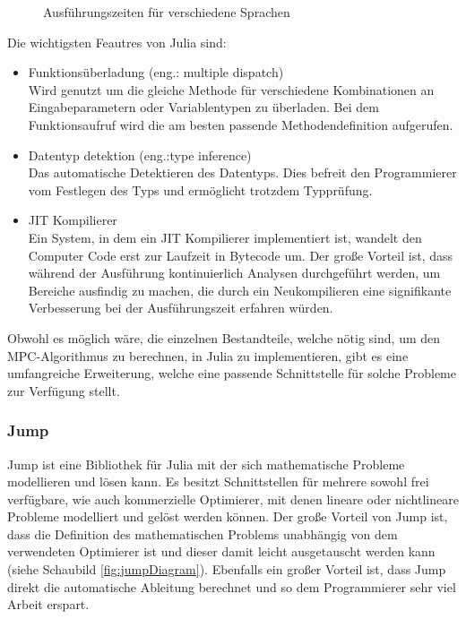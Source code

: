 \documentclass{like}
\begin{document}
\begin{figure}[ht!]
	\centering
	 
	\caption{Ausführungszeiten für verschiedene Sprachen}
	\label{fig:juliaBench}
\end{figure}

Die wichtigsten Feautres von Julia sind:

\begin{itemize}
	
	\item Funktionsüberladung (eng.: multiple dispatch)\\Wird genutzt um die gleiche Methode für verschiedene Kombinationen an Eingabeparametern oder Variablentypen zu überladen. Bei dem Funktionsaufruf wird die am besten passende Methodendefinition aufgerufen. \\
	\item Datentyp detektion (eng.:type inference) \\Das automatische Detektieren des Datentyps. Dies befreit den Programmierer vom Festlegen des Typs und ermöglicht trotzdem Typprüfung. \\
	\item \ac{JIT} Kompilierer\\ Ein System, in dem ein \ac{JIT} Kompilierer implementiert ist, wandelt den Computer Code erst zur Laufzeit in Bytecode um. Der große Vorteil ist, dass während der Ausführung kontinuierlich Analysen durchgeführt werden, um Bereiche ausfindig zu machen, die durch ein Neukompilieren eine signifikante Verbesserung bei der Ausführungszeit erfahren würden. \\
\end{itemize}

Obwohl es möglich wäre, die einzelnen Bestandteile, welche nötig sind, um den \ac{MPC}-Algorithmus zu berechnen, in Julia zu implementieren, gibt es eine umfangreiche Erweiterung, welche eine passende Schnittstelle für solche Probleme zur Verfügung stellt.

\subsubsection*{Jump}
\ac{Jump} ist eine Bibliothek für Julia mit der sich mathematische Probleme modellieren und lösen kann. Es besitzt Schnittstellen für mehrere sowohl frei verfügbare, wie auch kommerzielle Optimierer, mit denen lineare oder nichtlineare Probleme modelliert und gelöst werden können. Der große Vorteil von \ac{Jump} ist, dass die Definition des mathematischen Problems unabhängig von dem verwendeten Optimierer ist und dieser damit leicht ausgetauscht werden kann (siehe Schaubild \ref{fig:jumpDiagram}). Ebenfalls ein großer Vorteil ist, dass \ac{Jump} direkt  die automatische Ableitung berechnet und so dem Programmierer sehr viel Arbeit erspart. 
\end{document}
